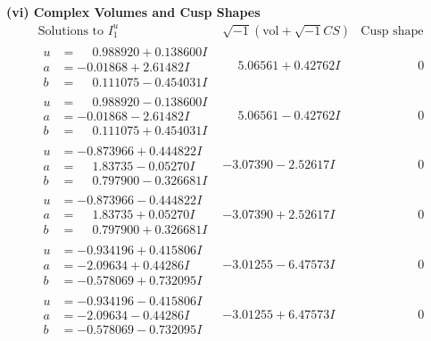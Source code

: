 \documentclass[1p]{elsarticle_modified}
\theoremstyle{definition}
\newcommand{\I}{\sqrt{-1}}
\begin{document}
\newpage\flushleft \textbf{(vi) Complex Volumes and Cusp Shapes}
$$\begin{array}{c|c|c}  
\text{Solutions to }I^u_{1}& \I (\text{vol} + \sqrt{-1}CS) & \text{Cusp shape}\\
 \hline 
\begin{aligned}
u &= \phantom{-}0.988920 + 0.138600 I \\
a &= -0.01868 + 2.61482 I \\
b &= \phantom{-}0.111075 - 0.454031 I\end{aligned}
 & \phantom{-}5.06561 + 0.42762 I & \phantom{-0.000000 } 0 \\ \hline\begin{aligned}
u &= \phantom{-}0.988920 - 0.138600 I \\
a &= -0.01868 - 2.61482 I \\
b &= \phantom{-}0.111075 + 0.454031 I\end{aligned}
 & \phantom{-}5.06561 - 0.42762 I & \phantom{-0.000000 } 0 \\ \hline\begin{aligned}
u &= -0.873966 + 0.444822 I \\
a &= \phantom{-}1.83735 - 0.05270 I \\
b &= \phantom{-}0.797900 - 0.326681 I\end{aligned}
 & -3.07390 - 2.52617 I & \phantom{-0.000000 } 0 \\ \hline\begin{aligned}
u &= -0.873966 - 0.444822 I \\
a &= \phantom{-}1.83735 + 0.05270 I \\
b &= \phantom{-}0.797900 + 0.326681 I\end{aligned}
 & -3.07390 + 2.52617 I & \phantom{-0.000000 } 0 \\ \hline\begin{aligned}
u &= -0.934196 + 0.415806 I \\
a &= -2.09634 + 0.44286 I \\
b &= -0.578069 + 0.732095 I\end{aligned}
 & -3.01255 - 6.47573 I & \phantom{-0.000000 } 0 \\ \hline\begin{aligned}
u &= -0.934196 - 0.415806 I \\
a &= -2.09634 - 0.44286 I \\
b &= -0.578069 - 0.732095 I\end{aligned}
 & -3.01255 + 6.47573 I & \phantom{-0.000000 } 0 \\ \hline\begin{aligned}

\end{aligned}
\end{array}$$
\end{document}
